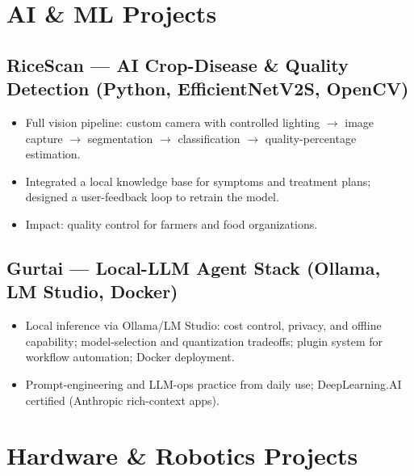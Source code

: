 \documentclass[10pt]{article}
\begin{document}
\section{AI \& ML Projects}

\subsection{RiceScan --- AI Crop-Disease \& Quality Detection \hfill (Python, EfficientNetV2S, OpenCV)}
\begin{itemize}
  \item Full vision pipeline: custom camera with controlled lighting $\to$ image capture $\to$ segmentation $\to$ classification $\to$ quality-percentage estimation.
  \item Integrated a local knowledge base for symptoms and treatment plans; designed a user-feedback loop to retrain the model.
  \item Impact: quality control for farmers and food organizations.
\end{itemize}

\subsection{Gurtai --- Local-LLM Agent Stack \hfill (Ollama, LM Studio, Docker)}
\begin{itemize}
  \item Local inference via Ollama/LM Studio: cost control, privacy, and offline capability; model-selection and quantization tradeoffs; plugin system for workflow automation; Docker deployment.
  \item Prompt-engineering and LLM-ops practice from daily use; DeepLearning.AI certified (Anthropic rich-context apps).
\end{itemize}

\section{Hardware \& Robotics Projects}
\end{document}
